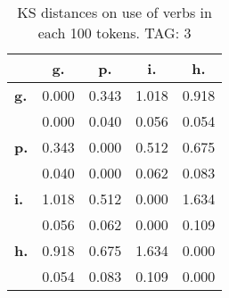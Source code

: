 \begin{table}[h!]
\begin{center}
\begin{tabular}{| l || c | c | c | c |}\hline
 & {\bf g.} & {\bf p.} & {\bf i.} & {\bf h.} \\\hline\hline
{\bf g.} & 0.000 & 0.343 & 1.018 & 0.918 \\
{\bf } & 0.000 & 0.040 & 0.056 & 0.054 \\\hline
{\bf p.} & 0.343 & 0.000 & 0.512 & 0.675 \\
{\bf } & 0.040 & 0.000 & 0.062 & 0.083 \\\hline
{\bf i.} & 1.018 & 0.512 & 0.000 & 1.634 \\
{\bf } & 0.056 & 0.062 & 0.000 & 0.109 \\\hline
{\bf h.} & 0.918 & 0.675 & 1.634 & 0.000 \\
{\bf } & 0.054 & 0.083 & 0.109 & 0.000 \\\hline
\end{tabular}
\caption{KS distances on use of verbs in each 100 tokens. TAG: 3}
\end{center}
\end{table}